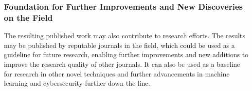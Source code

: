 \documentclass[a4paper, 12pt]{article}
\begin{document}
\subsubsection{ Foundation for Further Improvements and New Discoveries on the Field }

The resulting published work may also contribute to research efforts. The results may be published by reputable journals in the field, which could be used as a guideline for future research, enabling further improvements and new additions to improve the research quality of other journals. It can also be used as a baseline for research in other novel techniques and further advancements in machine learning and cybersecurity further down the line.

\clearpage


{}
\end{document}
